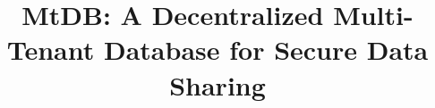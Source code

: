 \documentclass[conference]{IEEEtran}
\newcommand{\ours}{\xspace MtDB\xspace}
\begin{document}
%
\title{\ours: A Decentralized Multi-Tenant Database for Secure Data Sharing}




\end{document}
